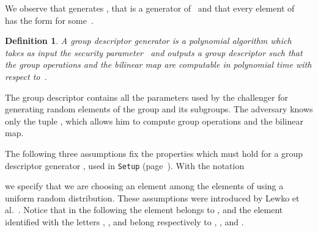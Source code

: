 \documentclass[a4paper,10pt]{article}
\newtheorem{definition}{Definition}
\newcommand{\singlefunction}[1]{\texttt{#1}}
\begin{document}
		We observe that  generates , that  is a generator of~ and that every element of~ has the form  for some~.
		\begin{definition}
		\label{groupdesgen.def}
		A \emph{group descriptor generator}  is a polynomial algorithm which takes as input the security parameter~ and outputs a group descriptor \linebreak  such that 
	the group operations and the bilinear map  are computable in polynomial time with respect to~.
	\end{definition}
	


	The group descriptor  contains all the parameters used by the challenger for generating random elements of the group   and its subgroups. The adversary knows only the tuple , which allows him to compute group operations and the bilinear map.
	
	The  following three assumptions fix the properties which must hold for a group descriptor generator , used in \singlefunction{Setup} (page~\pageref{RS-ABE_Setup-theory}).
	With the notation
	
	we specify that we are choosing an element  among the elements of  using a uniform random distribution. These assumptions were introduced by Lewko et al.~\cite{lewko2010assumptions}.
	Notice that in the following 
	the element  belongs to , and 
	the element identified with the letters , , and  belong respectively to , , and .
\end{document}
